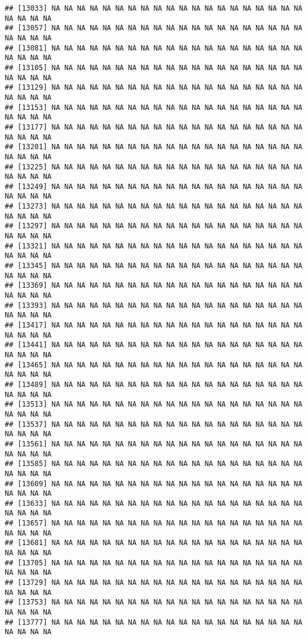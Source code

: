 \documentclass[
]{article}
\begin{document}
\begin{verbatim}
## [13033] NA NA NA NA NA NA NA NA NA NA NA NA NA NA NA NA NA NA NA NA NA NA NA NA
## [13057] NA NA NA NA NA NA NA NA NA NA NA NA NA NA NA NA NA NA NA NA NA NA NA NA
## [13081] NA NA NA NA NA NA NA NA NA NA NA NA NA NA NA NA NA NA NA NA NA NA NA NA
## [13105] NA NA NA NA NA NA NA NA NA NA NA NA NA NA NA NA NA NA NA NA NA NA NA NA
## [13129] NA NA NA NA NA NA NA NA NA NA NA NA NA NA NA NA NA NA NA NA NA NA NA NA
## [13153] NA NA NA NA NA NA NA NA NA NA NA NA NA NA NA NA NA NA NA NA NA NA NA NA
## [13177] NA NA NA NA NA NA NA NA NA NA NA NA NA NA NA NA NA NA NA NA NA NA NA NA
## [13201] NA NA NA NA NA NA NA NA NA NA NA NA NA NA NA NA NA NA NA NA NA NA NA NA
## [13225] NA NA NA NA NA NA NA NA NA NA NA NA NA NA NA NA NA NA NA NA NA NA NA NA
## [13249] NA NA NA NA NA NA NA NA NA NA NA NA NA NA NA NA NA NA NA NA NA NA NA NA
## [13273] NA NA NA NA NA NA NA NA NA NA NA NA NA NA NA NA NA NA NA NA NA NA NA NA
## [13297] NA NA NA NA NA NA NA NA NA NA NA NA NA NA NA NA NA NA NA NA NA NA NA NA
## [13321] NA NA NA NA NA NA NA NA NA NA NA NA NA NA NA NA NA NA NA NA NA NA NA NA
## [13345] NA NA NA NA NA NA NA NA NA NA NA NA NA NA NA NA NA NA NA NA NA NA NA NA
## [13369] NA NA NA NA NA NA NA NA NA NA NA NA NA NA NA NA NA NA NA NA NA NA NA NA
## [13393] NA NA NA NA NA NA NA NA NA NA NA NA NA NA NA NA NA NA NA NA NA NA NA NA
## [13417] NA NA NA NA NA NA NA NA NA NA NA NA NA NA NA NA NA NA NA NA NA NA NA NA
## [13441] NA NA NA NA NA NA NA NA NA NA NA NA NA NA NA NA NA NA NA NA NA NA NA NA
## [13465] NA NA NA NA NA NA NA NA NA NA NA NA NA NA NA NA NA NA NA NA NA NA NA NA
## [13489] NA NA NA NA NA NA NA NA NA NA NA NA NA NA NA NA NA NA NA NA NA NA NA NA
## [13513] NA NA NA NA NA NA NA NA NA NA NA NA NA NA NA NA NA NA NA NA NA NA NA NA
## [13537] NA NA NA NA NA NA NA NA NA NA NA NA NA NA NA NA NA NA NA NA NA NA NA NA
## [13561] NA NA NA NA NA NA NA NA NA NA NA NA NA NA NA NA NA NA NA NA NA NA NA NA
## [13585] NA NA NA NA NA NA NA NA NA NA NA NA NA NA NA NA NA NA NA NA NA NA NA NA
## [13609] NA NA NA NA NA NA NA NA NA NA NA NA NA NA NA NA NA NA NA NA NA NA NA NA
## [13633] NA NA NA NA NA NA NA NA NA NA NA NA NA NA NA NA NA NA NA NA NA NA NA NA
## [13657] NA NA NA NA NA NA NA NA NA NA NA NA NA NA NA NA NA NA NA NA NA NA NA NA
## [13681] NA NA NA NA NA NA NA NA NA NA NA NA NA NA NA NA NA NA NA NA NA NA NA NA
## [13705] NA NA NA NA NA NA NA NA NA NA NA NA NA NA NA NA NA NA NA NA NA NA NA NA
## [13729] NA NA NA NA NA NA NA NA NA NA NA NA NA NA NA NA NA NA NA NA NA NA NA NA
## [13753] NA NA NA NA NA NA NA NA NA NA NA NA NA NA NA NA NA NA NA NA NA NA NA NA
## [13777] NA NA NA NA NA NA NA NA NA NA NA NA NA NA NA NA NA NA NA NA NA NA NA NA

\end{verbatim}
\end{document}
